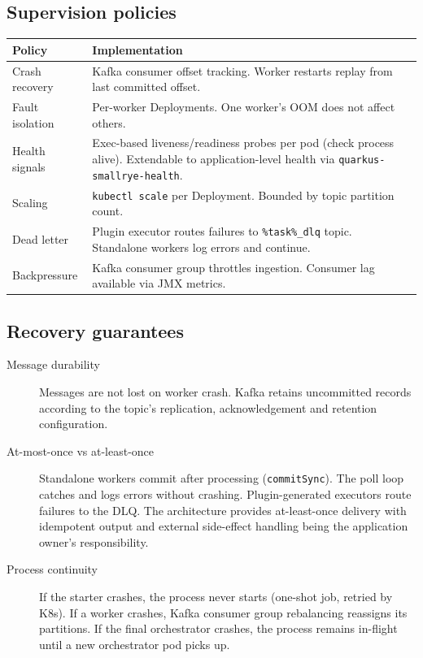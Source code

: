 \subsection{Supervision policies}

\begin{longtable}{|>{\raggedright\arraybackslash}p{}|>{\raggedright\arraybackslash}p{}|}
\hline
\rowcolor[gray]{0.9}\textbf{Policy} & \textbf{Implementation} \\
\hline
Crash recovery & Kafka consumer offset tracking. Worker restarts replay from
last committed offset. \\
\hline
Fault isolation & Per-worker Deployments. One worker's OOM does not affect
others. \\
\hline
Health signals & Exec-based liveness/readiness probes per pod (check process
alive). Extendable to application-level health via
\texttt{quarkus-smallrye-health}. \\
\hline
Scaling & \texttt{kubectl scale} per Deployment. Bounded by topic partition
count. \\
\hline
Dead letter & Plugin executor routes failures to \texttt{\%task\%\_dlq}
topic. Standalone workers log errors and continue. \\
\hline
Backpressure & Kafka consumer group throttles ingestion. Consumer lag
available via JMX metrics. \\
\hline
\end{longtable}

\subsection{Recovery guarantees}

\begin{description}
\item[Message durability] Messages are not lost on worker crash. Kafka
      retains uncommitted records according to the topic's replication,
      acknowledgement and retention configuration.
\item[At-most-once vs at-least-once] Standalone workers commit after
      processing (\texttt{commitSync}). The poll loop catches and logs
      errors without crashing. Plugin-generated executors route failures
      to the DLQ. The architecture provides at-least-once delivery with
      idempotent output and external side-effect handling being the application
      owner's responsibility.
\item[Process continuity] If the starter crashes, the process never starts
      (one-shot job, retried by K8s). If a worker crashes, Kafka consumer
      group rebalancing reassigns its partitions. If the final orchestrator
      crashes, the process remains in-flight until a new orchestrator pod
      picks up.
\end{description}

